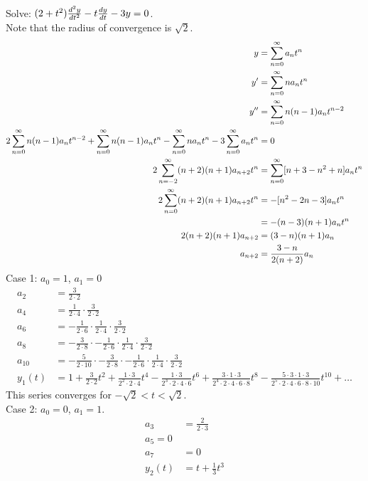 \documentclass[12pt]{article}
\begin{document}
\begin{example} Solve: $(2 + t^2)\frac{d^2y}{dt^2} - t\frac{dy}{dt} - 3y = 0$. \\ Note that the radius of convergence is $\sqrt{2}$.  $$\begin{aligned} 
y&= \sum_{n = 0}^{\infty} a_nt^n \\ y' &= \sum_{n = 0}^{\infty} na_nt^n \\ y'' &= \sum_{n = 0}^{\infty} n(n - 1)a_nt^{n - 2} \\ 2\sum_{n = 0}^{\infty} n(n - 1)a_nt^{n - 2} + \sum_{n = 0}^{\infty} n(n - 1)a_nt^n - \sum_{n = 0}^{\infty} na_nt^n - 3\sum_{n = 0}^{\infty} a_nt^n &= 0 \\ 2\sum_{n = -2}^{\infty} (n + 2)(n + 1)a_{n + 2}t^n &= \sum_{n = 0}^{\infty} [n + 3 - n^2 + n] a_nt^n \\ 2\sum_{n = 0}^{\infty} (n + 2)(n + 1)a_{n + 2}t^n &= -[n^2 - 2n - 3]a_nt^n \\ &= -(n - 3)(n + 1)a_nt^n \\ 2(n + 2)(n + 1)a_{n + 2} &= (3 - n)(n + 1)a_n \\ a_{n + 2} &= \frac{3 - n}{2(n + 2)}a_n \end{aligned} $$ Case 1: $a_0 = 1$, $a_1 = 0$ $$\begin{aligned} 
a_2 &= \frac{3}{2 \cdot 2} \\ a_4 &= \frac{1}{2\cdot 4} \cdot \frac{3}{2 \cdot 2} \\ a_6 &= -\frac{1}{2 \cdot 6} \cdot \frac{1}{2 \cdot 4} \cdot \frac{3}{2 \cdot 2} \\ a_8 &= -\frac{3}{2 \cdot 8} \cdot -\frac{1}{2 \cdot 6} \cdot \frac{1}{2 \cdot 4} \cdot \frac{3}{2 \cdot 2} \\ a_{10} &= -\frac{5}{2 \cdot 10} \cdot - \frac{3}{2 \cdot 8} \cdot -\frac{1}{2 \cdot 6} \cdot \frac{1}{2 \cdot 4} \cdot \frac{3}{2 \cdot 2} \\ y_1(t) &= 1 + \frac{3}{2\cdot 2}t^2 + \frac{1 \cdot 3}{2^2 \cdot 2 \cdot 4}t^4 - \frac{1 \cdot 3}{2^3 \cdot 2 \cdot 4 \cdot 6}t^6 + \frac{3 \cdot 1 \cdot 3}{2^4 \cdot 2 \cdot 4 \cdot 6 \cdot 8}t^8 - \frac{5 \cdot 3 \cdot 1 \cdot 3}{2^5 \cdot 2 \cdot 4 \cdot 6 \cdot 8 \cdot 10}t^{10} + \dots \end{aligned} $$ This series converges for $-\sqrt{2} < t < \sqrt{2}$. \\ Case 2: $a_0 = 0$, $a_1 = 1$. $$\begin{aligned} a_3 &= \frac{2}{2 \cdot 3} \\ a_5 = 0 \\ a_7 &= 0 \\ y_2(t) &= t + \frac{1}{3}t^3 \end{aligned} $$ \end{example} 
\end{document}
